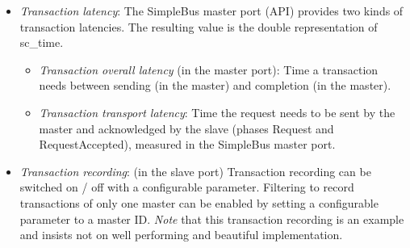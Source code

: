 \begin{itemize}
   \item   {\em Transaction latency}: \newline
		  \newline
		The SimpleBus master port (API) provides two kinds of transaction latencies. The resulting value
		is the double representation of sc\_time.
      \begin{itemize}
          \item  {\em Transaction overall latency} (in the master port):    
          		Time a transaction needs between sending (in the master) 
			and completion (in the master).
	   \item  {\em Transaction transport latency}:
			Time the request needs to be sent by the master and acknowledged by the slave
		(phases {\sffamily Request} and {\sffamily RequestAccepted}), measured in the SimpleBus master port.
       \end{itemize}
       
   \item  {\em Transaction recording}: \newline
	 (in the slave port) \newline
	Transaction recording can be switched on / off with a configurable parameter.
	Filtering to record transactions of only one master can be enabled by setting a configurable 
	parameter to a master ID. \newline
	{\em Note} that this transaction recording is an example and insists not on well performing 
	and beautiful implementation.
   	
   	
\end{itemize}

